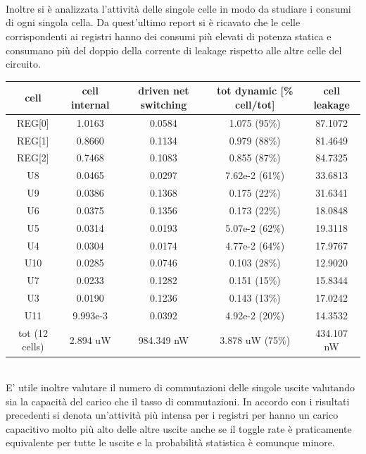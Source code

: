 \\
\\
\\
Inoltre si è  analizzata l’attività delle singole celle in modo da studiare i consumi di ogni singola cella. Da quest’ultimo report si è ricavato che le celle corrispondenti ai registri hanno dei consumi più elevati di potenza statica e consumano più del doppio della corrente di leakage rispetto alle altre celle del circuito.
\begin{table}[!h]\footnotesize
	\centering
	\begin{tabular}{|c|c|c|c|c|}
		\hline
		\textbf{cell} & \textbf{cell internal} & \textbf{driven net switching} & \textbf{tot dynamic [\% cell/tot]}& \textbf{cell leakage}\\
		\hline
		REG[0] & 1.0163 & 0.0584 & 1.075 (95\%) & 87.1072\\
		\hline
		REG[1] & 0.8660 & 0.1134 & 0.979 (88\%) & 81.4649\\
		\hline
		REG[2] & 0.7468 & 0.1083 & 0.855 (87\%) & 84.7325\\
		\hline
		U8 & 0.0465 & 0.0297 & 7.62e-2 (61\%) & 33.6813\\
		\hline
		U9 & 0.0386 & 0.1368 & 0.175 (22\%) & 31.6341\\
		\hline
		U6 & 0.0375 & 0.1356 & 0.173 (22\%) & 18.0848\\
		\hline
		U5 & 0.0314 & 0.0193 & 5.07e-2 (62\%) & 19.3118\\
		\hline
		U4 & 0.0304 & 0.0174 & 4.77e-2 (64\%) & 17.9767\\
		\hline
		U10 & 0.0285 & 0.0746 & 0.103 (28\%) & 12.9020\\
		\hline
		U7 & 0.0233 & 0.1282 & 0.151 (15\%) & 15.8344\\
		\hline
		U3 & 0.0190 & 0.1236 & 0.143 (13\%) & 17.0242\\
		\hline
		U11 & 9.993e-3 & 0.0392 & 4.92e-2 (20\%) & 14.3532\\
		\hline
		\hline
		tot (12 cells) & 2.894 uW & 984.349 nW & 3.878 uW (75\%) & 434.107 nW\\
		\hline 
	\end{tabular}
\end{table} \\
E’ utile inoltre valutare il numero di commutazioni delle singole uscite valutando sia la capacità del carico che il tasso di commutazioni. In accordo con i risultati precedenti si denota un’attività più intensa per i registri per hanno un carico capacitivo molto più alto delle altre uscite anche se il toggle rate è praticamente equivalente per tutte le uscite e la probabilità statistica è comunque minore. 
